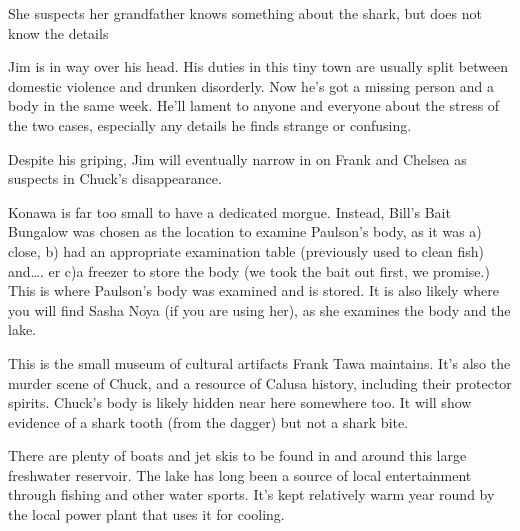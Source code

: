 \documentclass{motw}
\begin{document}
She suspects her grandfather knows something about the shark, but does not know the details


Jim is in way over his head.  His duties in this tiny town are usually split between domestic violence and drunken disorderly.  Now he's got a missing person and a body in the same week.  He'll lament to anyone and everyone about the stress of the two cases, especially any details he finds strange or confusing.

Despite his griping, Jim will eventually narrow in on Frank and Chelsea as suspects in Chuck's disappearance. 




Konawa is far too small to have a dedicated morgue. Instead, Bill’s Bait Bungalow was chosen as the location to examine Paulson’s body, as it was a) close, b) had an appropriate examination table (previously used to clean fish) and…. er c)a freezer to store the body (we took the bait out first, we promise.) This is where Paulson’s body was examined and is stored. It is also likely where you will find Sasha Noya (if you are using her), as she examines the body and the lake.


This is the small museum of cultural artifacts Frank Tawa maintains. It’s also the murder scene of Chuck, and a resource of Calusa history, including their protector spirits. Chuck’s body is likely hidden near here somewhere too.  It will show evidence of a shark tooth (from the dagger) but not a shark bite.


There are plenty of boats and jet skis to be found in and around this large freshwater reservoir. The lake has long been a source of local entertainment through fishing and other water sports. It’s kept relatively warm year round by the local power plant that uses it for cooling.  
\end{document}
